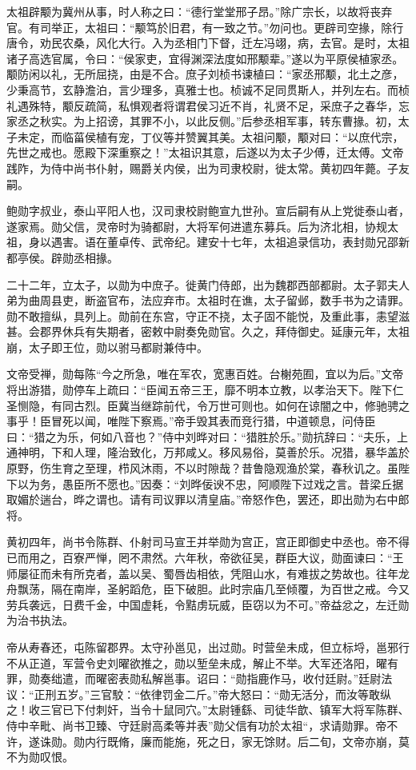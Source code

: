 \documentclass[12pt,UTF8]{ctexbook}
\begin{document}
太祖辟颙为冀州从事，时人称之曰：“德行堂堂邢子昂。”除广宗长，以故将丧弃官。有司举正，太祖曰：“颙笃於旧君，有一致之节。”勿问也。更辟司空掾，除行唐令，劝民农桑，风化大行。入为丞相门下督，迁左冯翊，病，去官。是时，太祖诸子高选官属，令曰：“侯家吏，宜得渊深法度如邢颙辈。”遂以为平原侯植家丞。颙防闲以礼，无所屈挠，由是不合。庶子刘桢书谏植曰：“家丞邢颙，北土之彦，少秉高节，玄静澹泊，言少理多，真雅士也。桢诚不足同贯斯人，并列左右。而桢礼遇殊特，颙反疏简，私惧观者将谓君侯习近不肖，礼贤不足，采庶子之春华，忘家丞之秋实。为上招谤，其罪不小，以此反侧。”后参丞相军事，转东曹掾。初，太子未定，而临菑侯植有宠，丁仪等并赞翼其美。太祖问颙，颙对曰：“以庶代宗，先世之戒也。愿殿下深重察之！”太祖识其意，后遂以为太子少傅，迁太傅。文帝践阼，为侍中尚书仆射，赐爵关内侯，出为司隶校尉，徙太常。黄初四年薨。子友嗣。

鲍勋字叔业，泰山平阳人也，汉司隶校尉鲍宣九世孙。宣后嗣有从上党徙泰山者，遂家焉。勋父信，灵帝时为骑都尉，大将军何进遣东募兵。后为济北相，协规太祖，身以遇害。语在董卓传、武帝纪。建安十七年，太祖追录信功，表封勋兄邵新都亭侯。辟勋丞相掾。

二十二年，立太子，以勋为中庶子。徙黄门侍郎，出为魏郡西部都尉。太子郭夫人弟为曲周县吏，断盗官布，法应弃市。太祖时在谯，太子留邺，数手书为之请罪。勋不敢擅纵，具列上。勋前在东宫，守正不挠，太子固不能悦，及重此事，恚望滋甚。会郡界休兵有失期者，密敕中尉奏免勋官。久之，拜侍御史。延康元年，太祖崩，太子即王位，勋以驸马都尉兼侍中。

文帝受禅，勋每陈“今之所急，唯在军农，宽惠百姓。台榭苑囿，宜以为后。”文帝将出游猎，勋停车上疏曰：“臣闻五帝三王，靡不明本立教，以孝治天下。陛下仁圣恻隐，有同古烈。臣冀当继踪前代，令万世可则也。如何在谅闇之中，修驰骋之事乎！臣冒死以闻，唯陛下察焉。”帝手毁其表而竞行猎，中道顿息，问侍臣曰：“猎之为乐，何如八音也？”侍中刘晔对曰：“猎胜於乐。”勋抗辞曰：“夫乐，上通神明，下和人理，隆治致化，万邦咸乂。移风易俗，莫善於乐。况猎，暴华盖於原野，伤生育之至理，栉风沐雨，不以时隙哉？昔鲁隐观渔於棠，春秋讥之。虽陛下以为务，愚臣所不愿也。”因奏：“刘晔佞谀不忠，阿顺陛下过戏之言。昔梁丘据取媚於遄台，晔之谓也。请有司议罪以清皇庙。”帝怒作色，罢还，即出勋为右中郎将。

黄初四年，尚书令陈群、仆射司马宣王并举勋为宫正，宫正即御史中丞也。帝不得已而用之，百寮严惮，罔不肃然。六年秋，帝欲征吴，群臣大议，勋面谏曰：“王师屡征而未有所克者，盖以吴、蜀唇齿相依，凭阻山水，有难拔之势故也。往年龙舟飘荡，隔在南岸，圣躬蹈危，臣下破胆。此时宗庙几至倾覆，为百世之戒。今又劳兵袭远，日费千金，中国虚耗，令黠虏玩威，臣窃以为不可。”帝益忿之，左迁勋为治书执法。

帝从寿春还，屯陈留郡界。太守孙邕见，出过勋。时营垒未成，但立标埒，邕邪行不从正道，军营令史刘曜欲推之，勋以堑垒未成，解止不举。大军还洛阳，曜有罪，勋奏绌遣，而曜密表勋私解邕事。诏曰：“勋指鹿作马，收付廷尉。”廷尉法议：“正刑五岁。”三官駮：“依律罚金二斤。”帝大怒曰：“勋无活分，而汝等敢纵之！收三官已下付刺奸，当令十鼠同穴。”太尉锺繇、司徒华歆、镇军大将军陈群、侍中辛毗、尚书卫臻、守廷尉高柔等并表”勋父信有功於太祖“，求请勋罪。帝不许，遂诛勋。勋内行既脩，廉而能施，死之日，家无馀财。后二旬，文帝亦崩，莫不为勋叹恨。
\end{document}
